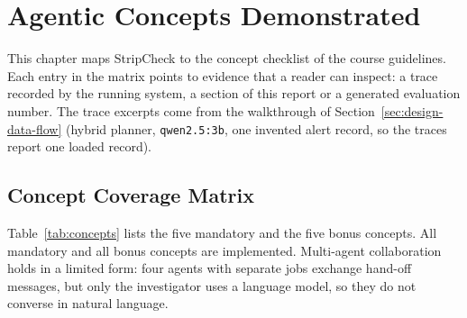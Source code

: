 \chapter{Agentic Concepts Demonstrated}
\label{ch:concepts}

This chapter maps StripCheck to the concept checklist of the course guidelines. Each entry in the matrix points to evidence that a reader can inspect: a trace recorded by the running system, a section of this report or a generated evaluation number. The trace excerpts come from the walkthrough of Section~\ref{sec:design-data-flow} (hybrid planner, \texttt{qwen2.5:3b}, one invented alert record, so the traces report one loaded record).

\section{Concept Coverage Matrix}
\label{sec:concepts-concept-coverage-matrix}

Table~\ref{tab:concepts} lists the five mandatory and the five bonus concepts. All mandatory and all bonus concepts are implemented. Multi-agent collaboration holds in a limited form: four agents with separate jobs exchange hand-off messages, but only the investigator uses a language model, so they do not converse in natural language.

